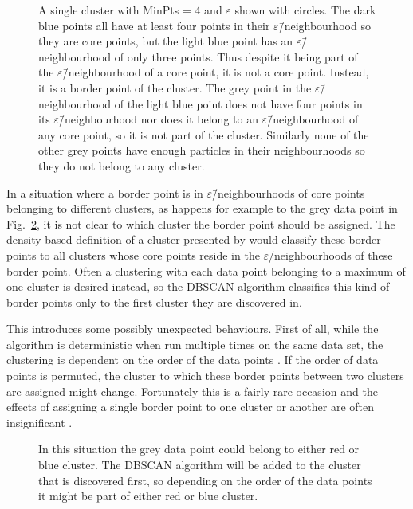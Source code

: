 \documentclass[english, twoside]{HYgradu}
\begin{document}
\begin{figure}
    \centering
    
    \caption{A single cluster with MinPts = 4 and $\varepsilon$ shown with circles. The dark blue points all have at least four points in their $\varepsilon$\=/neighbourhood so they are core points, but the light blue point has an $\varepsilon$\=/neighbourhood of only three points. Thus despite it being part of the $\varepsilon$\=/neighbourhood of a core point, it is not a core point. Instead, it is a border point of the cluster. The grey point in the $\varepsilon$\=/neighbourhood of the light blue point does not have four points in its $\varepsilon$\=/neighbourhood nor does it belong to an $\varepsilon$\=/neighbourhood of any core point, so it is not part of the cluster. Similarly none of the other grey points have enough particles in their neighbourhoods so they do not belong to any cluster.}\label{fig:DBSCAN-borderpoint}
\end{figure}

In a situation where a border point is in $\varepsilon$\=/neighbourhoods of core points belonging to different clusters, as happens for example to the grey data point in Fig.\ \ref{fig:DBSCAN-ambiquity}, it is not clear to which cluster the border point should be assigned. The density-based definition of a cluster presented by \citet{ester1996density} would classify these border points to all clusters whose core points reside in the $\varepsilon$\=/neighbourhoods of these border point. Often a clustering with each data point belonging to a maximum of one cluster is desired instead, so the DBSCAN algorithm classifies this kind of border points only to the first cluster they are discovered in. 

This introduces some possibly unexpected behaviours. First of all, while the algorithm is deterministic when run multiple times on the same data set, the clustering is dependent on the order of the data points \citep{schubert2017dbscan}. If the order of data points is permuted, the cluster to which these border points between two clusters are assigned might change. Fortunately this is a fairly rare occasion and the effects of assigning a single border point to one cluster or another are often insignificant \citep{schubert2017dbscan}.

\begin{figure}
    \centering
    
    \caption{In this situation the grey data point could belong to either red or blue cluster. The DBSCAN algorithm will be added to the cluster that is discovered first, so depending on the order of the data points it might be part of either red or blue cluster.}\label{fig:DBSCAN-ambiquity}
\end{figure}
\end{document}
